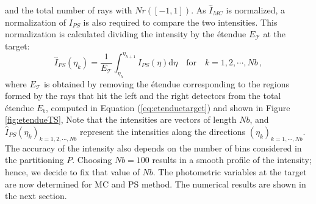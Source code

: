  and the total number of rays with $Nr([-1, 1])$. As $\hat{I}_{MC}$  is normalized, a normalization
 of $I_{PS}$ is also required to compare the two intensities.
 This normalization is calculated dividing the intensity by the \'{e}tendue $E_{\mathcal{T}}$ at the target:
 \begin{equation}
 \hat{I}_{PS}(\eta_k) = \frac{1}{E_{\mathcal{T}}} \int_{\eta_h}^{\eta_{h+1}}{I}_{PS}(\eta)\textrm{d}\eta \quad \mbox{for} \quad k = 1,2, \cdots, Nb\,,
 \end{equation}
where ${E_{\mathcal{T}}}$ is obtained by removing the \'{e}tendue corresponding to the regions formed by the rays that hit the left and the right detectors from the total \'{e}tendue $E_{\textrm{t}}$, computed in Equation (\ref{eq:etenduetarget}) and shown in Figure \ref{fig:etendueTS},
Note that the intensities are vectors of length $Nb$, and $\hat{I}_{PS}(\eta_k)_{k = 1,2, \cdots, Nb}$ represent the intensities along the directions $(\eta_k)_{k = 1, \cdots, Nb}$.
The accuracy of the intensity also depends on the number of bins considered in the partitioning $P$.
 Choosing $Nb=100$ results in a smooth profile of the intensity;
 hence, we decide to fix that value of $Nb$.
The photometric variables at the target are now determined for MC and PS method.
The numerical results are shown in the next section.

